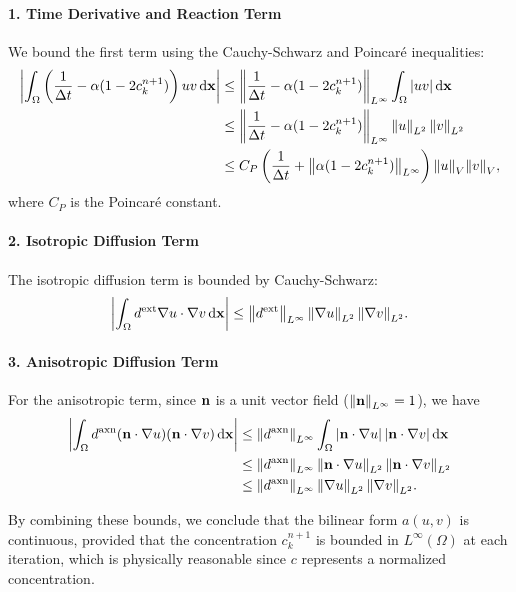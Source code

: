 \documentclass[12pt, a4paper, twoside, openright]{report}
\begin{document}
\paragraph{1. Time Derivative and Reaction Term} 
We bound the first term using the Cauchy-Schwarz and Poincaré inequalities:
\begin{align*}
\abs{\int_{\Omega} \left( \frac{1}{\Delta t} - \alpha(1-2c_k^{n+1}) \right) u v \, \dd \vb{x}}
& \le \norm{\frac{1}{\Delta t} - \alpha (1-2c_k^{n+1})}_{L^\infty} \int_{\Omega} \abs{u v} \, \dd \vb{x} \\
& \le \norm{\frac{1}{\Delta t} - \alpha (1-2c_k^{n+1})}_{L^\infty} \, \norm{u}_{L^2} \, \norm{v}_{L^2} \\
& \le C_P \left( \frac{1}{\Delta t} + \norm{\alpha (1-2c_k^{n+1})}_{L^\infty} \right) \norm{u}_{V} \norm{v}_{V},
\end{align*}
where $C_P$ is the Poincaré constant.

\paragraph{2. Isotropic Diffusion Term} 
The isotropic diffusion term is bounded by Cauchy-Schwarz:
\[
\abs{\int_{\Omega} d^{\mathrm{ext}} \vb{\nabla} u \cdot \vb{\nabla} v \, \dd \vb{x}} \le \norm{d^{\mathrm{ext}}}_{L^\infty} \, \norm{\vb{\nabla} u}_{L^2} \, \norm{\vb{\nabla} v}_{L^2}.
\]

\paragraph{3. Anisotropic Diffusion Term} 
For the anisotropic term, since $\vb{n}$ is a unit vector field ($\norm{\vb{n}}_{L^\infty} = 1$), we have
\begin{align*}
\abs{\int_{\Omega} d^{\mathrm{axn}} (\vb{n} \cdot \vb{\nabla} u)(\vb{n} \cdot \vb{\nabla} v) \, \dd \vb{x}}
& \le \norm{d^{\mathrm{axn}}}_{L^\infty} \int_{\Omega} \abs{\vb{n} \cdot \vb{\nabla} u} \, \abs{\vb{n} \cdot \vb{\nabla} v} \, \dd \vb{x} \\
& \le \norm{d^{\mathrm{axn}}}_{L^\infty} \, \norm{\vb{n} \cdot \vb{\nabla} u}_{L^2} \, \norm{\vb{n} \cdot \vb{\nabla} v}_{L^2} \\
& \le \norm{d^{\mathrm{axn}}}_{L^\infty} \, \norm{\vb{\nabla} u}_{L^2} \, \norm{\vb{\nabla} v}_{L^2}.
\end{align*}

By combining these bounds, we conclude that the bilinear form $a(u,v)$ is continuous, provided that the concentration $c_k^{n+1}$ is bounded in $L^\infty(\Omega)$ at each iteration, which is physically reasonable since $c$ represents a normalized concentration.
\end{document}
